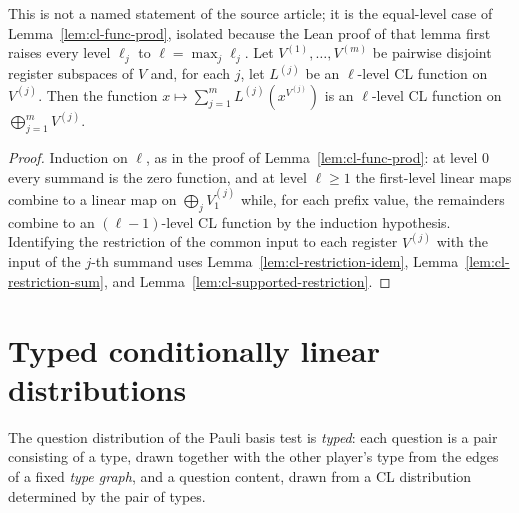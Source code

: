 \begin{lemma}\label{lem:cl-func-prod-same-level}
	\leanok
	This is not a named statement of the source article; it is the equal-level case of Lemma~\ref{lem:cl-func-prod}, isolated because the Lean proof of that lemma first raises every level $\ell_j$ to $\ell = \max_j \ell_j$. Let $V^{(1)}, \dots, V^{(m)}$ be pairwise disjoint register subspaces of $V$ and, for each $j$, let $L^{(j)}$ be an $\ell$-level CL function on $V^{(j)}$. Then the function $x \mapsto \sum_{j=1}^m L^{(j)}(x^{V^{(j)}})$ is an $\ell$-level CL function on $\bigoplus_{j=1}^m V^{(j)}$.
\end{lemma}
\begin{proof}
	\leanok
	Induction on $\ell$, as in the proof of Lemma~\ref{lem:cl-func-prod}: at level $0$ every summand is the zero function, and at level $\ell \ge 1$ the first-level linear maps combine to a linear map on $\bigoplus_j V^{(j)}_1$ while, for each prefix value, the remainders combine to an $(\ell-1)$-level CL function by the induction hypothesis. Identifying the restriction of the common input to each register $V^{(j)}$ with the input of the $j$-th summand uses Lemma~\ref{lem:cl-restriction-idem}, Lemma~\ref{lem:cl-restriction-sum}, and Lemma~\ref{lem:cl-supported-restriction}.
\end{proof}

\section{Typed conditionally linear distributions}
\label{sec:types}

The question distribution of the Pauli basis test is \emph{typed}: each question is a pair consisting of a type, drawn together with the other player's type from the edges of a fixed \emph{type graph}, and a question content, drawn from a CL distribution determined by the pair of types.

